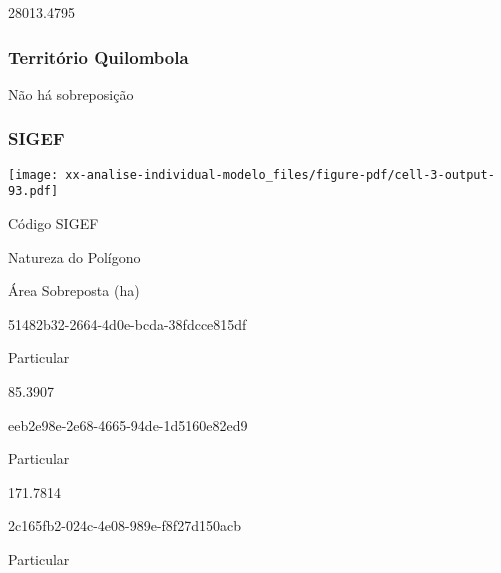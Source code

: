\documentclass[
  11pt,
  a4paper,
  DIV=11,
  numbers=noendperiod]{scrartcl}
\begin{document}
28013.4795

\n    

\n  

\n

\subsubsection{Território Quilombola}\label{territuxf3rio-quilombola-4}

Não há sobreposição

\subsubsection{SIGEF}\label{sigef-4}

\texttt{[image: xx-analise-individual-modelo\_files/figure-pdf/cell-3-output-93.pdf]}

\n  

\n    

\n      

Código SIGEF

\n      

Natureza do Polígono

\n      

Área Sobreposta (ha)

\n    

\n  

\n  

\n    

\n      

51482b32-2664-4d0e-bcda-38fdcce815df

\n      

Particular

\n      

85.3907

\n    

\n    

\n      

eeb2e98e-2e68-4665-94de-1d5160e82ed9

\n      

Particular

\n      

171.7814

\n    

\n    

\n      

2c165fb2-024c-4e08-989e-f8f27d150acb

\n      

Particular

\n      
\end{document}
